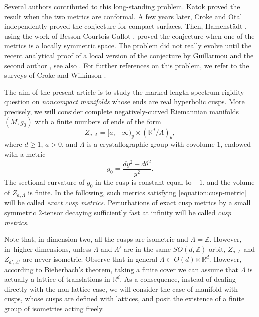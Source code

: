 \documentclass[JEP,XML,SOM,Unicode,NoFloatCountersInSection]{cedram}
\newcommand{\R}{\mathbb{R}}
\newcommand{\Z}{\mathbb{Z}}
\theoremstyle{plain}
\theoremstyle{definition}
\begin{document}
Several authors contributed to this long-standing problem. Katok \cite{Katok-88} proved the result when the two metrics are conformal. A few years later, Croke \cite{Croke-90} and Otal \cite{Otal-90} independently proved the conjecture for compact surfaces. Then, Hamenstädt \cite{Hamenstadt-99}, using the work of Besson-Courtois-Gallot \cite{Besson-Courtois-Gallot-95}, proved the conjecture when one of the metrics is a locally symmetric space. The problem did not really evolve until the recent analytical proof of a local version of the conjecture by Guillarmou and the second author \cite{Guillarmou-Lefeuvre-18}, see also \cite{Guillarmou-Knieper-Lefeuvre-22}. For further references on this problem, we refer to the surveys of Croke \cite{Croke-04} and Wilkinson \cite{Wilkinson-14}.

The aim of the present article is to study the marked length spectrum rigidity question on \emph{noncompact manifolds} whose ends are real hyperbolic cusps. More precisely, we will consider complete negatively-curved Riemannian manifolds $(M,g_0)$ with a finite numbers of ends of the form
\begin{equation}
\label{equation:cusp-top}
Z_{a,\Lambda} = [a,+\infty)_y \times (\R^d/\Lambda)_\theta,
\end{equation}
where $d \geq 1$, $a>0$, and $\Lambda$ is a crystallographic group with covolume $1$, endowed with a metric
\begin{equation}
\label{equation:cusp-metric}
g_0 = \frac{dy^2 + d\theta^2}{y^2}.
\end{equation}
The sectional curvature of $g_0$ in the cusp is constant equal to $-1$, and the volume of $Z_{a,\Lambda}$ is finite. In the following, such metrics satisfying \eqref{equation:cusp-metric} will be called \emph{exact cusp metrics}. Perturbations of exact cusp metrics by a small symmetric $2$-tensor decaying sufficiently fast at infinity will be called \emph{cusp metrics}.

Note that, in dimension two, all the cusps are isometric and $\Lambda = \Z$. However, in~higher dimensions, unless $\Lambda$ and $\Lambda'$ are in the same $SO(d,\Z)$-orbit, $Z_{a,\Lambda}$ and $Z_{a',\Lambda'}$ are never isometric. Observe that in general $\Lambda \subset O(d)\ltimes \R^d$. However, according to Bieberbach's theorem, taking a finite cover we can assume that $\Lambda$ is actually a lattice of translations in $\R^d$. As a consequence, instead of dealing directly with the non-lattice case, we will consider the case of manifold with cusps, whose cusps are defined with lattices, and posit the existence of a finite group of isometries acting freely.
\end{document}

